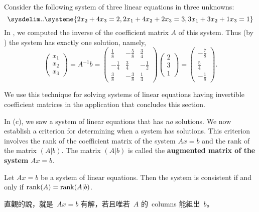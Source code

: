 \begin{example} \label{example 3.3.4}
Consider the following system of three linear equations in three unknowns:
\[
    \sysdelim..\systeme{
        2 x_2 + 4 x_3 = 2,
        2 x_1 + 4 x_2 + 2 x_3 = 3,
        3 x_1 + 3 x_2 + 1 x_3 = 1}
\]
In , we computed the inverse of the coefficient matrix \(A\) of this system.
Thus (by ) the system has exactly one solution, namely,
\[
    \begin{pmatrix} x_1 \\ x_2 \\ x_3 \end{pmatrix} = A^{-1}b 
    = \left(\begin{array}{rrr}
        \frac{1}{8} & -\frac{5}{8} & \frac{3}{4} \\
        -\frac{1}{4} & \frac{3}{4} & -\frac{1}{2} \\
        \frac{3}{8} & -\frac{3}{8} & \frac{1}{4}
    \end{array}\right)
    \begin{pmatrix}
        2 \\ 3 \\ 1
    \end{pmatrix}
    = \begin{pmatrix}
        -\frac{7}{8} \\ \frac{5}{4} \\ -\frac1{8}
    \end{pmatrix}.
\]
\end{example}

We use this technique for solving systems of linear equations having invertible coefficient matrices in the application that concludes this section.

In (c), we saw a system of linear equations that has \emph{no} solutions.
We now establish a criterion for determining when a system has solutions.
This criterion involves the rank of the coefficient matrix of the system \(Ax = b\) and the rank of the matrix \((A|b)\).
The matrix \((A|b)\) is called the \textbf{augmented matrix of the system} \(Ax = b\).

\begin{theorem} \label{thm 3.11}
Let \(Ax = b\) be a system of linear equations.
Then the system is consistent if and only if \(\mathrm{rank}(A) = \mathrm{rank}(A|b)\).
\end{theorem}

\begin{note}
直觀的說，就是\ \(Ax = b\) 有解，若且唯若\ \(A\) 的\ columns 能組出\ \(b\)。
\end{note}

